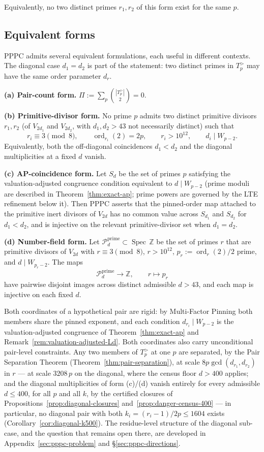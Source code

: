 \documentclass[11pt]{amsart}
\theoremstyle{plain}
\theoremstyle{definition}
\theoremstyle{remark}
\numberwithin{equation}{section}
\newcommand{\ord}{\operatorname{ord}}
\newcommand{\Spec}{\operatorname{Spec}}
\newcommand{\Z}{\mathbb{Z}}
\begin{document}
Equivalently, no two distinct primes $r_1, r_2$ of this form exist for the same $p$.

\subsection{Equivalent forms}\label{sec:equiv-forms}

PPPC admits several equivalent formulations, each useful in different contexts. The diagonal case $d_1=d_2$ is part of the statement: two distinct primes in $T_p^{>}$ may have the same order parameter $d_r$.

\textbf{(a) Pair-count form.} $\Pi := \sum_p \binom{|T_p^{>}|}{2} = 0$.

\textbf{(b) Primitive-divisor form.} No prime $p$ admits two distinct primitive divisors $r_1,r_2$ (of $V_{2d_1}$ and $V_{2d_2}$, with $d_1,d_2>43$ not necessarily distinct) such that
\[
  r_i \equiv 3 \pmod 8,\qquad \ord_{r_i}(2)=2p,\qquad
  r_i>10^{12},\qquad d_i\mid W_{p-2}.
\]
Equivalently, both the off-diagonal coincidences $d_1<d_2$ and the diagonal multiplicities at a fixed $d$ vanish.

\textbf{(c) AP-coincidence form.} Let $S_d$ be the set of primes $p$ satisfying the valuation-adjusted congruence condition equivalent to $d\mid W_{p-2}$ (prime moduli are described in Theorem~\ref{thm:exact-ap}; prime powers are governed by the LTE refinement below it). Then PPPC asserts that the pinned-order map attached to the primitive inert divisors of $V_{2d}$ has no common value across $S_{d_1}$ and $S_{d_2}$ for $d_1<d_2$, and is injective on the relevant primitive-divisor set when $d_1=d_2$.

\textbf{(d) Number-field form.} Let $\mathcal{P}_d^{\mathrm{prime}} \subset \Spec\,\Z$ be the set of primes $r$ that are primitive divisors of $V_{2 d}$ with $r \equiv 3 \pmod 8$, $r > 10^{12}$, $p_r:=\ord_r(2)/2$ prime, and $d\mid W_{p_r-2}$. The maps
\[
  \mathcal{P}_d^{\mathrm{prime}} \longrightarrow \Z,\qquad r \longmapsto p_r
\]
have pairwise disjoint images across distinct admissible $d>43$, and each map is injective on each fixed $d$.

Both coordinates of a hypothetical pair are rigid: by Multi-Factor Pinning both members share the pinned exponent, and each condition $d_{r_i} \mid W_{p-2}$ is the valuation-adjusted congruence of Theorem~\ref{thm:exact-ap} and Remark~\ref{rem:valuation-adjusted-Ld}. Both coordinates also carry unconditional pair-level constraints. Any two members of $T_p^{>}$ at one $p$ are separated, by the Pair Separation Theorem (Theorem~\ref{thm:pair-separation}), at scale $8 p \gcd(d_{r_1}, d_{r_2})$ in $r$ --- at scale $3208\,p$ on the diagonal, where the census floor $d > 400$ applies; and the diagonal multiplicities of form (c)/(d) vanish entirely for every admissible $d \leq 400$, for all $p$ and all $k$, by the certified closures of Propositions~\ref{prop:diagonal-closures} and~\ref{prop:danger-census-400} --- in particular, no diagonal pair with both $k_i = (r_i - 1)/2p \leq 1604$ exists (Corollary~\ref{cor:diagonal-k500}). The residue-level structure of the diagonal sub-case, and the question that remains open there, are developed in Appendix~\ref{sec:pppc-problem} and \S\ref{sec:pppc-directions}.
\end{document}
